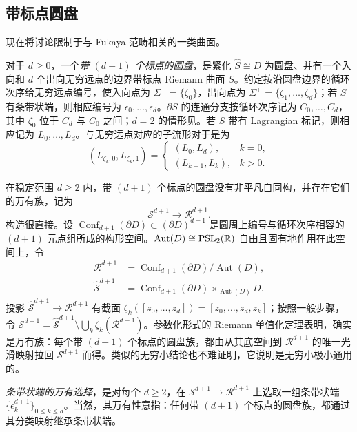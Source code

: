 \subsection{带标点圆盘}\label{sec:9c}
现在将讨论限制于与 Fukaya 范畴相关的一类曲面。
\begin{definition*}
对于 $d\geq0$，一个\emph{带 $(d+1)$ 个标点的圆盘}，是紧化 $\widehat S\cong D$ 为圆盘、并有一个入向和 $d$ 个出向无穷远点的边界带标点 Riemann 曲面 $S$。约定按沿圆盘边界的循环次序给无穷远点编号，使入向点为 $\Sigma^-=\{\zeta_0\}$，出向点为 $\Sigma^+=\{\zeta_1,\ldots,\zeta_d\}$；若 $S$ 有条带状端，则相应编号为 $\epsilon_0,\ldots,\epsilon_d$。$\partial S$ 的连通分支按循环次序记为 $C_0,\ldots,C_d$，其中 $\zeta_0$ 位于 $C_d$ 与 $C_0$ 之间；$d=2$ 的情形见。若 $S$ 带有 Lagrangian 标记，则相应记为 $L_0,\ldots,L_d$。与无穷远点对应的子流形对于是为
\begin{equation}\label{eq:9.5}
(L_{\zeta_k,0},L_{\zeta_k,1})=\begin{cases}(L_0,L_d),&k=0,\\(L_{k-1},L_k),&k>0.\end{cases}
\end{equation}

\end{definition*}
在稳定范围 $d\geq2$ 内，带 $(d+1)$ 个标点的圆盘没有非平凡自同构，并存在它们的万有族，记为
\begin{equation}\label{eq:9.6}
\mathcal S^{d+1}\longrightarrow\mathcal R^{d+1}.
\end{equation}
构造很直接。设 $\operatorname{Conf}_{d+1}(\partial D)\subset(\partial D)^{d+1}$ 是圆周上编号与循环次序相容的 $(d+1)$ 元点组所成的构形空间。$\operatorname{Aut}(D)\cong\operatorname{PSL}_2(\mathbb R)$ 自由且固有地作用在此空间上，令
\begin{equation}\label{eq:9.7}
\begin{aligned}
\mathcal R^{d+1}&=\operatorname{Conf}_{d+1}(\partial D)/\operatorname{Aut}(D),\\
\widehat{\mathcal S}^{d+1}&=\operatorname{Conf}_{d+1}(\partial D)\times_{\operatorname{Aut}(D)}D.
\end{aligned}
\end{equation}
投影 $\widehat{\mathcal S}^{d+1}\to\mathcal R^{d+1}$ 有截面 $\zeta_k([z_0,\ldots,z_d])=[z_0,\ldots,z_d,z_k]$；按照一般步骤，令 $\mathcal S^{d+1}=\widehat{\mathcal S}^{d+1}\setminus\bigcup_k\zeta_k(\mathcal R^{d+1})$。参数化形式的 Riemann 单值化定理表明，确实是万有族：每个带 $(d+1)$ 个标点的圆盘族，都由从其底空间到 $\mathcal R^{d+1}$ 的唯一光滑映射拉回 $\mathcal S^{d+1}$ 而得。类似的无穷小结论也不难证明，它说明是无穷小极小通用的。
\begin{definition*}
\emph{条带状端的万有选择}，是对每个 $d\geq2$，在 $\mathcal S^{d+1}\to\mathcal R^{d+1}$ 上选取一组条带状端 $\{\epsilon_k^{d+1}\}_{0\leq k\leq d}$。当然，其万有性意指：任何带 $(d+1)$ 个标点的圆盘族，都通过其分类映射继承条带状端。
\end{definition*}

